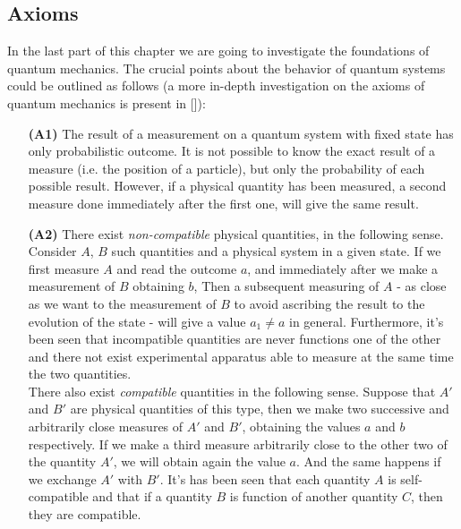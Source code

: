  \subsection{Axioms}
 In the last part of this chapter we are going to investigate the foundations of quantum mechanics. The crucial points about the behavior of quantum systems could be outlined as follows (a more in-depth investigation on the axioms of quantum mechanics is present in [\citealp[Chap. 7]{more}]):
 
 \begin{itemize}
 	\item[\textbf{(A1)}] The result of a measurement on a quantum system with fixed state has only probabilistic outcome. It is not possible to know the exact result of a measure (i.e. the position of a particle), but only the probability of each possible result. However, if a physical quantity has been measured, a second measure done immediately after the first one, will give the same result.
 	\item[\textbf{(A2)}]There exist \textit{non-compatible} physical quantities, in the following sense. Consider $A$, $B$ such quantities and a physical system in a given state. If we first measure $A$ and read the outcome $a$, and immediately after we make a measurement of $B$ obtaining $b$, Then a subsequent measuring of $A$ - as close as we want to the measurement of $B$ to avoid ascribing the result to the evolution of the state - will give a value $a_1\neq a$ in general. Furthermore, it's been seen that incompatible quantities are never functions one of the other and there not exist experimental apparatus able to measure at the same time the two quantities.\\
 	There also exist \textit{compatible} quantities in the following sense. Suppose that $A'$ and $B'$ are physical quantities of this type, then we make two successive and arbitrarily close measures of $A'$ and $B'$, obtaining the values $a$ and $b$ respectively. If we make a third measure arbitrarily close to the other two of the quantity $A'$, we will obtain again the value $a$. And the same happens if we exchange $A'$ with $B'$. It's has been seen that each quantity $A$ is self-compatible and that if a quantity $B$ is function of another quantity $C$, then they are compatible.
 \end{itemize}
 
